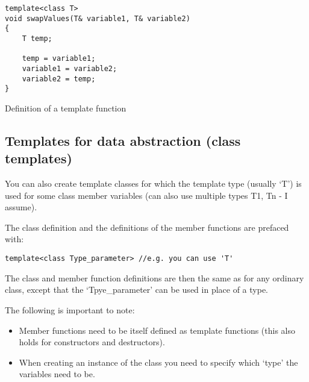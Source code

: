 \begin{listing}[H]
\begin{verbatim}
template<class T>
void swapValues(T& variable1, T& variable2)
{
	T temp;
	
	temp = variable1;
	variable1 = variable2;
	variable2 = temp;
}
\end{verbatim}
\caption{Definition of a template function}
\label{source_code_1}
\end{listing}




\subsection{Templates for data abstraction (class templates)}
You can also create template classes for which the template type (usually `T') is used for some
class member variables (can also use multiple types T1, Tn - I assume).


The class definition and the definitions of the member functions are prefaced with:
\begin{verbatim}
template<class Type_parameter> //e.g. you can use 'T'
\end{verbatim}

The class and member function definitions are then the same as for any ordinary class, except
that the `Tpye\_parameter' can be used in place of a type.

The following is important to note:
\begin{itemize}
	\item Member functions need to be itself defined as template functions
	(this also holds for constructors and destructors).
	\item When creating an instance of the class you need to specify which `type' the
	variables need to be.
\end{itemize}

